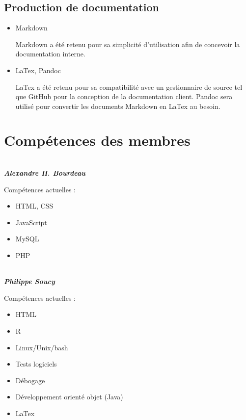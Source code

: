 \documentclass[letter,12pt]{exam}
\begin{document}
\subsection{Production de documentation}

\begin{itemize}

\item
  Markdown

  Markdown a été retenu pour sa simplicité d'utilisation afin de concevoir la documentation interne.
\item
  LaTex, Pandoc

  LaTex a été retenu pour sa compatibilité avec un gestionnaire de source tel que GitHub pour la conception de la documentation client. Pandoc sera utilisé pour convertir les documents Markdown en LaTex au besoin.

\end{itemize}

\section{Compétences des membres}

\\

\textbf{\emph{Alexandre H. Bourdeau}}

Compétences actuelles :

\begin{itemize}
\item
  HTML, CSS

\item JavaScript

\item MySQL

\item PHP

\end{itemize}

\\

\textbf{\emph{Philippe Soucy}}

Compétences actuelles :

\begin{itemize}
\item HTML

\item R

\item Linux/Unix/bash

\item Tests logiciels

\item Débogage

\item Développement orienté objet (Java)

\item LaTex

\end{itemize}
\end{document}
